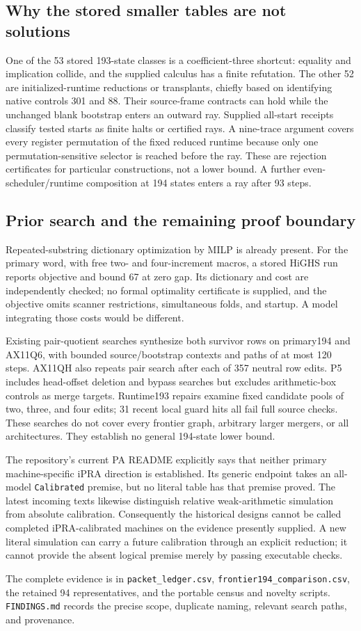 \subsection{Why the stored smaller tables are not solutions}

One of the 53 stored 193-state classes is a coefficient-three shortcut:
equality and implication collide, and the supplied calculus has a finite
refutation. The other 52 are initialized-runtime reductions or transplants,
chiefly based on identifying native controls 301 and 88. Their source-frame
contracts can hold while the unchanged blank bootstrap enters an outward
ray. Supplied all-start receipts classify tested starts as finite halts or
certified rays. A nine-trace argument covers every register permutation of
the fixed reduced runtime because only one permutation-sensitive selector
is reached before the ray. These are rejection certificates for particular
constructions, not a lower bound. A further even-scheduler/runtime
composition at 194 states enters a ray after 93 steps.

\subsection{Prior search and the remaining proof boundary}

Repeated-substring dictionary optimization by MILP is already present.
For the primary word, with free two- and four-increment macros, a stored
HiGHS run reports objective and bound 67 at zero gap. Its dictionary and
cost are independently checked; no formal optimality certificate is
supplied, and the objective omits scanner restrictions, simultaneous folds,
and startup. A model integrating those costs would be different.

Existing pair-quotient searches synthesize both survivor rows on primary194
and AX11Q6, with bounded source/bootstrap contexts and paths of at most
120 steps. AX11QH also repeats pair search after each of 357 neutral row
edits. P5 includes head-offset deletion and bypass searches but excludes
arithmetic-box controls as merge targets. Runtime193 repairs examine fixed
candidate pools of two, three, and four edits; 31 recent local guard hits
all fail full source checks. These searches do not cover every frontier
graph, arbitrary larger mergers, or all architectures. They establish no
general 194-state lower bound.

The repository's current PA README explicitly says that neither primary
machine-specific iPRA direction is established. Its generic endpoint takes
an all-model \texttt{Calibrated} premise, but no literal table has that
premise proved. The latest incoming texts likewise distinguish relative
weak-arithmetic simulation from absolute calibration. Consequently the
historical designs cannot be called completed iPRA-calibrated machines on
the evidence presently supplied. A new literal simulation can carry a
future calibration through an explicit reduction; it cannot provide the
absent logical premise merely by passing executable checks.

The complete evidence is in \texttt{packet\_ledger.csv},
\texttt{frontier194\_comparison.csv}, the retained 94 representatives, and
the portable census and novelty scripts. \texttt{FINDINGS.md} records the
precise scope, duplicate naming, relevant search paths, and provenance.
